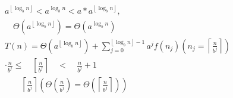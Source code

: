 $$
\begin{array}{c}
a^{\left\lfloor\log _{b} n\right\rfloor}<a^{\log _{b} n}<a * a^{\left\lfloor\log _{b} n\right\rfloor}, \\\quad \Theta\left(a^{\left\lfloor\log _{b} n\right\rfloor}\right)=\Theta\left(a^{\log _{b} n}\right)\\T(n)= 
\Theta\left(a^{\left\lfloor\log _{b} n\right\rfloor}\right)+\sum_{j=0}^{\left\lfloor\log _{b} n\right\rfloor-1} a^{j} f\left(n_{j}\right)\left(n_{j}=\left\lceil\frac{n}{b^{j}}\right\rceil\right) \\
\cdot \frac{n}{b^{j}} \leq \quad\left[\frac{n}{b^{j}}\right\rceil \quad<\quad \frac{n}{b^{j}}+1\\ \quad  \quad  \left\lceil\frac{n}{b^{j}}\right\rceil\left(\Theta\left(\frac{n}{b^{j}}\right)=\right. 
\left.\Theta\left(\left\lceil\frac{n}{b^{j}}\right\rceil\right)\right) 
\end{array}
$$

